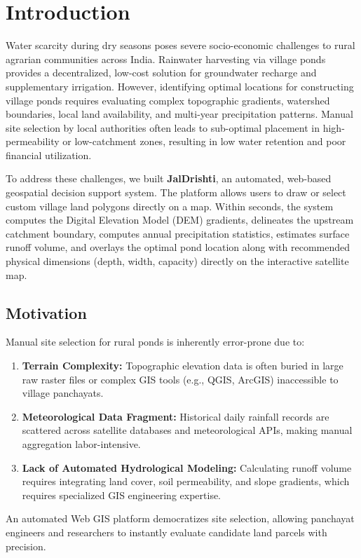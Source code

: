 \documentclass[manuscript,screen,review]{acmart}
\begin{document}
\section{Introduction}
\label{sec:intro}
Water scarcity during dry seasons poses severe socio-economic challenges to rural agrarian communities across India. Rainwater harvesting via village ponds provides a decentralized, low-cost solution for groundwater recharge and supplementary irrigation. However, identifying optimal locations for constructing village ponds requires evaluating complex topographic gradients, watershed boundaries, local land availability, and multi-year precipitation patterns. Manual site selection by local authorities often leads to sub-optimal placement in high-permeability or low-catchment zones, resulting in low water retention and poor financial utilization.

To address these challenges, we built \textbf{JalDrishti}, an automated, web-based geospatial decision support system. The platform allows users to draw or select custom village land polygons directly on a map. Within seconds, the system computes the Digital Elevation Model (DEM) gradients, delineates the upstream catchment boundary, computes annual precipitation statistics, estimates surface runoff volume, and overlays the optimal pond location along with recommended physical dimensions (depth, width, capacity) directly on the interactive satellite map.

\subsection{Motivation}
Manual site selection for rural ponds is inherently error-prone due to:
\begin{enumerate}
    \item \textbf{Terrain Complexity:} Topographic elevation data is often buried in large raw raster files or complex GIS tools (e.g., QGIS, ArcGIS) inaccessible to village panchayats.
    \item \textbf{Meteorological Data Fragment:} Historical daily rainfall records are scattered across satellite databases and meteorological APIs, making manual aggregation labor-intensive.
    \item \textbf{Lack of Automated Hydrological Modeling:} Calculating runoff volume requires integrating land cover, soil permeability, and slope gradients, which requires specialized GIS engineering expertise.
\end{enumerate}
An automated Web GIS platform democratizes site selection, allowing panchayat engineers and researchers to instantly evaluate candidate land parcels with precision.
\end{document}
